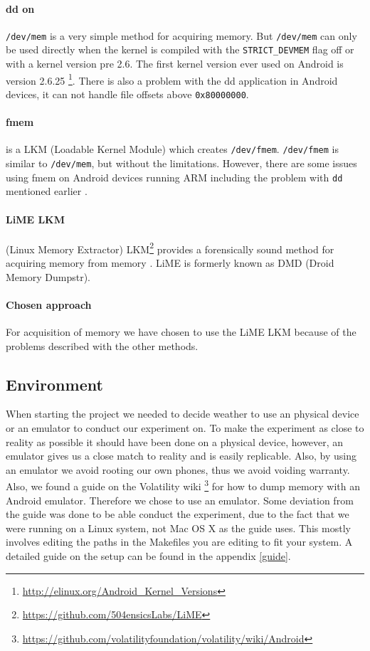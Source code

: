 \paragraph{dd on} \texttt{/dev/mem} is a very simple method for acquiring memory. But \texttt{/dev/mem} 
can only be used directly when the kernel is compiled with the \texttt{STRICT\_DEVMEM} flag off or with 
a kernel version pre 2.6. The first kernel version ever used on Android is version 2.6.25
\footnote{\url{http://elinux.org/Android\_Kernel\_Versions}}. There is also a problem with the dd 
application in Android devices, it can not handle file offsets above \texttt{0x80000000}\cite{acq_vol_android_mem}.
\paragraph{fmem} is a LKM (Loadable Kernel Module) which creates \texttt{/dev/fmem}. \texttt{/dev/fmem} 
is similar to \texttt{/dev/mem}, but without the limitations. However, there are some issues using 
fmem on Android devices running ARM including the problem with \texttt{dd} mentioned earlier \cite{acq_vol_android_mem}.
\paragraph{LiME LKM} (Linux Memory Extractor) LKM\footnote{\url{https://github.com/504ensicsLabs/LiME}} 
provides a forensically sound method for acquiring memory from memory \cite{heriyanto2013procedures}. 
LiME is formerly known as DMD (Droid Memory Dumpstr).
\paragraph{Chosen approach} For acquisition of memory we have chosen to use the LiME LKM because of 
the problems described with the other methods.
\subsection{Environment}
When starting the project we needed to decide weather to use an physical device 
or an emulator to conduct our experiment on. To make the experiment as close to 
reality as possible it should have been done on a physical device, however, an 
emulator gives us a close match to reality and is easily replicable. Also, by 
using an emulator we avoid rooting our own phones, thus we avoid voiding 
warranty. Also, we found a guide on the Volatility wiki
\footnote{\url{https://github.com/volatilityfoundation/volatility/wiki/Android}} 
for how to dump memory with an Android emulator. Therefore we chose to use an 
emulator. Some deviation from the guide was done to be able conduct the 
experiment, due to the fact that we were running on a Linux system, not Mac OS 
X as the guide uses. This mostly involves editing the paths in the Makefiles 
you are editing to fit your system. %
A detailed guide on the setup can be found in the appendix \ref{guide}.\\

